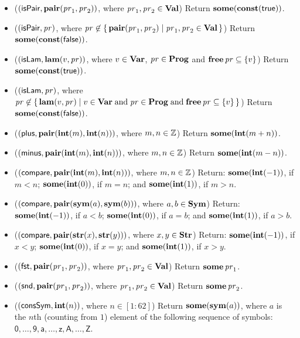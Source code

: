 \begin{itemize}
\item ($(\mathsf{isPair}, \mathbf{pair}(\mathit{pr}_1,\mathit{pr}_2))$, where
  $\mathit{pr}_1,\mathit{pr}_2\in\mathbf{Val}$)
  Return $\mathbf{some}(\mathbf{const}(\mathsf{true}))$.

\item ($(\mathsf{isPair}, \mathit{pr})$, where $\mathit{pr}\not\in
  \{ \, \mathbf{pair}(\mathit{pr}_1,\mathit{pr}_2) \mid \mathit{pr}_1,\mathit{pr}_2\in\mathbf{Val} \, \}$)
  Return $\mathbf{some}(\mathbf{const}(\mathsf{false}))$.

\item ($(\mathsf{isLam}, \mathbf{lam}(v,\mathit{pr}))$, where
  $v\in\mathbf{Var}$, $\mathit{pr}\in\mathbf{Prog}$ and $\mathbf{free}\,\mathit{pr}\subseteq\{v\}$)
  Return $\mathbf{some}(\mathbf{const}(\mathsf{true}))$.

\item ($(\mathsf{isLam}, \mathit{pr})$, where $\mathit{pr}\not\in
  \{ \, \mathbf{lam}(v,\mathit{pr}) \mid v\in\mathbf{Var}\;\allowbreak\mbox{and}\allowbreak\;\mathit{pr}\in\mathbf{Prog}\;\allowbreak\mbox{and}\allowbreak\;
    \mathbf{free}\,\mathit{pr}\subseteq\{v\} \, \}$)
  Return $\mathbf{some}(\mathbf{const}(\mathsf{false}))$.

\item ($(\mathsf{plus}, \mathbf{pair}(\mathbf{int}(m),\mathbf{int}(n)))$, where
  $m,n\in\mathbb{Z}$)
  Return $\mathbf{some}(\mathbf{int}(m + n))$.

\item ($(\mathsf{minus}, \mathbf{pair}(\mathbf{int}(m),\mathbf{int}(n)))$, where
  $m,n\in\mathbb{Z}$)
  Return $\mathbf{some}(\mathbf{int}(m - n))$.

\item ($(\mathsf{compare}, \mathbf{pair}(\mathbf{int}(m),\mathbf{int}(n)))$, where
  $m,n\in\mathbb{Z}$)
  Return: $\mathbf{some}\allowbreak(\mathbf{int}(-1))$, if $m < n$;
  $\mathbf{some}(\mathbf{int}(0))$, if $m = n$; and
  $\mathbf{some}(\mathbf{int}(1))$, if $m > n$.

\item ($(\mathsf{compare}, \mathbf{pair}(\mathbf{sym}(a),\mathbf{sym}(b)))$, where
  $a,b\in\mathbf{Sym}$)
  Return: $\mathbf{some}\allowbreak(\mathbf{int}(-1))$, if $a < b$;
  $\mathbf{some}(\mathbf{int}(0))$, if $a = b$; and
  $\mathbf{some}(\mathbf{int}(1))$, if $a > b$.

\item ($(\mathsf{compare}, \mathbf{pair}(\mathbf{str}(x),\mathbf{str}(y)))$, where
  $x,y\in\mathbf{Str}$)
  Return: $\mathbf{some}\allowbreak(\mathbf{int}(-1))$, if $x < y$;
  $\mathbf{some}(\mathbf{int}(0))$, if $x = y$; and
  $\mathbf{some}(\mathbf{int}(1))$, if $x > y$.

\item ($(\mathsf{fst}, \mathbf{pair}(\mathit{pr}_1,\mathit{pr}_2))$, where
  $\mathit{pr}_1,\mathit{pr}_2\in\mathbf{Val}$)
  Return $\mathbf{some}\,\mathit{pr}_1$.

\item ($(\mathsf{snd}, \mathbf{pair}(\mathit{pr}_1,\mathit{pr}_2))$, where
  $\mathit{pr}_1,\mathit{pr}_2\in\mathbf{Val}$)
  Return $\mathbf{some}\,\mathit{pr}_2$.

\item ($(\mathsf{consSym}, \mathbf{int}(n))$, where $n\in[1:62]$) Return
  $\mathbf{some}(\mathbf{sym}(a))$, where $a$ is the $n$th (counting from $1$)
  element of the following sequence of symbols: $\mathsf{0, \ldots, 9,
  a, \ldots, z, A, \ldots, Z}$.


\end{itemize}
